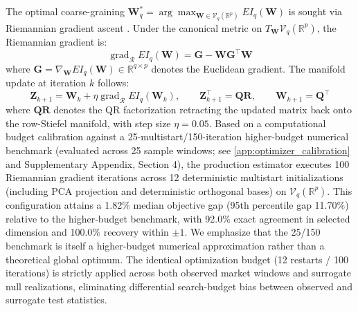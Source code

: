\documentclass[review,12pt,authoryear]{elsarticle}
\begin{document}
The optimal coarse-graining $\mathbf{W}_q^* = \arg\max_{\mathbf{W} \in \mathcal{V}_q(\mathbb{R}^p)} EI_q(\mathbf{W})$ is sought via Riemannian gradient ascent \citep{edelman1998geometry, absil2008optimization}. Under the canonical metric on $T_{\mathbf{W}}\mathcal{V}_q(\mathbb{R}^p)$, the Riemannian gradient is:
\begin{equation}
\operatorname{grad}_{\mathcal{R}} EI_q(\mathbf{W}) = \mathbf{G} - \mathbf{W}\mathbf{G}^\top \mathbf{W}
\end{equation}
where $\mathbf{G} = \nabla_{\mathbf{W}} EI_q(\mathbf{W}) \in \mathbb{R}^{q \times p}$ denotes the Euclidean gradient. The manifold update at iteration $k$ follows:
\begin{equation}
\mathbf{Z}_{k+1} = \mathbf{W}_k + \eta \operatorname{grad}_{\mathcal{R}} EI_q(\mathbf{W}_k), \qquad \mathbf{Z}_{k+1}^\top = \mathbf{Q}\mathbf{R}, \qquad \mathbf{W}_{k+1} = \mathbf{Q}^\top
\end{equation}
where $\mathbf{Q}\mathbf{R}$ denotes the QR factorization retracting the updated matrix back onto the row-Stiefel manifold, with step size $\eta = 0.05$. Based on a computational budget calibration against a 25-multistart/150-iteration higher-budget numerical benchmark (evaluated across 25 sample windows; see \ref{app:optimizer_calibration} and Supplementary Appendix, Section 4), the production estimator executes 100 Riemannian gradient iterations across 12 deterministic multistart initializations (including PCA projection and deterministic orthogonal bases) on $\mathcal{V}_q(\mathbb{R}^p)$. This configuration attains a 1.82\% median objective gap (95th percentile gap 11.70\%) relative to the higher-budget benchmark, with 92.0\% exact agreement in selected dimension and 100.0\% recovery within $\pm 1$. We emphasize that the 25/150 benchmark is itself a higher-budget numerical approximation rather than a theoretical global optimum. The identical optimization budget (12 restarts / 100 iterations) is strictly applied across both observed market windows and surrogate null realizations, eliminating differential search-budget bias between observed and surrogate test statistics.
\end{document}
